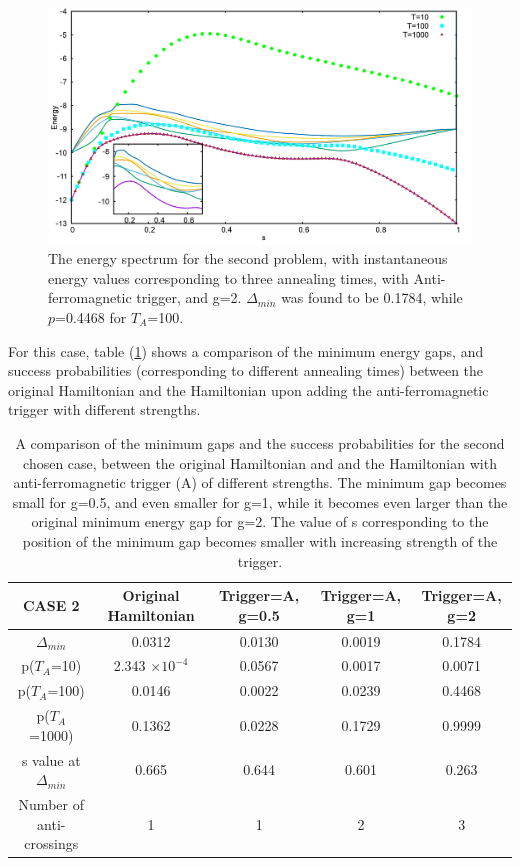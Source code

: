 \documentclass[12]{article}
\begin{document}
\begin{figure}[H]
\centering 
\includegraphics[scale=0.3]{950_s12_A_g2.png}
\caption{The energy spectrum for the second problem, with instantaneous energy values corresponding to three annealing times, with Anti-ferromagnetic trigger, and g=2. $\Delta_{min}$ was found to be 0.1784, while $p$=0.4468 for $T_A$=100. }
\label{fig:a6}
\end{figure}
For this case, table (\ref{tab:a2}) shows a comparison of the minimum energy gaps, and success probabilities (corresponding to different annealing times) between the original Hamiltonian and the Hamiltonian upon adding the anti-ferromagnetic trigger with different strengths. 

\begin{table}[H]
\centering
\renewcommand{\arraystretch}{1.5}
\begin{tabular}{|c|c|c|c|c|}
\hline 
CASE 2 & Original Hamiltonian & Trigger=A, g=0.5 & Trigger=A, g=1 & Trigger=A, g=2 \\ 
\hline 
$\Delta_{min}$ & 0.0312 & 0.0130 & 0.0019 & 0.1784 \\ 
\hline 
p($T_A$=10) & 2.343 $\times 10^{-4}$ & 0.0567 & 0.0017 & 0.0071\\ 
\hline 
p($T_A$=100) & 0.0146 & 0.0022 & 0.0239 & 0.4468 \\ 
\hline 
p($T_A$=1000) & 0.1362 & 0.0228 & 0.1729 & 0.9999 \\ 
\hline 
s value at $\Delta_{min}$ & 0.665 & 0.644 & 0.601 & 0.263 \\ 
\hline 
Number of anti-crossings & 1 & 1 & 2 & 3 \\
\hline
\end{tabular} 
\caption{A comparison of the minimum gaps and the success probabilities for the second chosen case, between the original Hamiltonian and and the Hamiltonian with anti-ferromagnetic trigger (A) of different strengths. The minimum gap becomes small for g=0.5, and even smaller for g=1, while it becomes even larger than the original minimum energy gap for g=2. The value of s corresponding to the position of the minimum gap becomes smaller with increasing strength of the trigger.}
\label{tab:a2}
\end{table}
\end{document}

